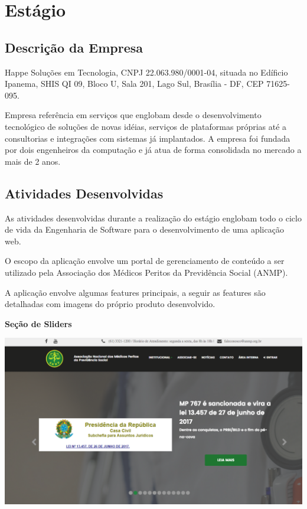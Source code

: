 \chapter[Estágio]{Estágio}

\section{Descrição da Empresa}

Happe Soluções em Tecnologia, CNPJ 22.063.980/0001-04, situada no Edíficio Ipanema,
SHIS QI 09, Bloco U, Sala 201, Lago Sul, Brasília - DF, CEP 71625-095.

Empresa referência em serviços que englobam desde o desenvolvimento tecnológico
de soluções de novas idéias, serviços de plataformas próprias até a consultorias e integrações
com sistemas já implantados. A empresa foi fundada por dois engenheiros da computação
e já atua de forma consolidada no mercado a mais de 2 anos.

\section{Atividades Desenvolvidas}

As atividades desenvolvidas durante a realização do estágio englobam todo o ciclo
de vida da Engenharia de Software para o desenvolvimento de uma aplicação web.

O escopo da aplicação envolve um portal de gerenciamento de conteúdo a ser utilizado
pela Associação dos Médicos Peritos da Previdência Social (ANMP).

A aplicação envolve algumas features principais, a seguir as features são detalhadas
com imagens do próprio produto desenvolvido.

\textbf{Seção de Sliders}

\includegraphics[keepaspectratio=true,scale=0.3]{figuras/banners.png}

